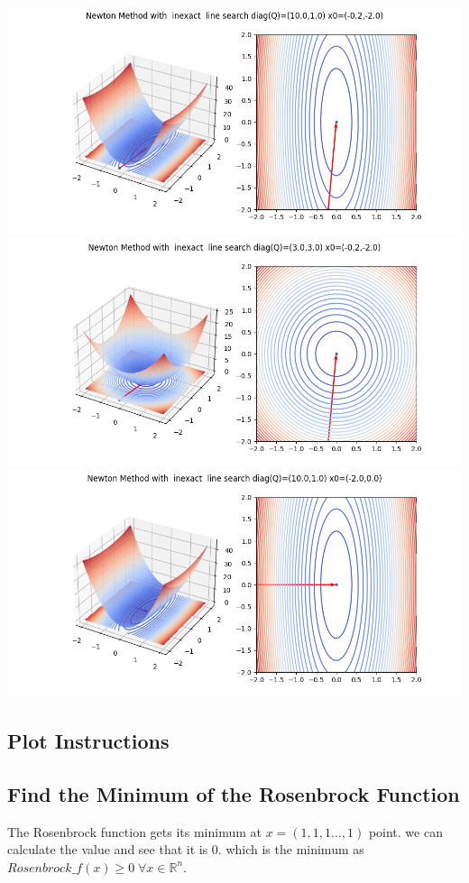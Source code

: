 \documentclass{article}
\begin{document}
\includegraphics[scale=0.5]{nm_inexact_1.png}
\includegraphics[scale=0.5]{nm_inexact_2_circle.png}
\includegraphics[scale=0.5]{nm_inexact_3_elipse_easy_start_point.png}
\subsection{Plot Instructions}
\subsection{Find  the  Minimum  of  the  Rosenbrock  Function}
The Rosenbrock function gets its minimum at $x = (1,1,1...,1)$ point. we can calculate the value and see that it is 0. which is the minimum as $Rosenbrock\_f(x) \geq 0\; \forall x \in \mathbb{R}^n$.
\end{document}

